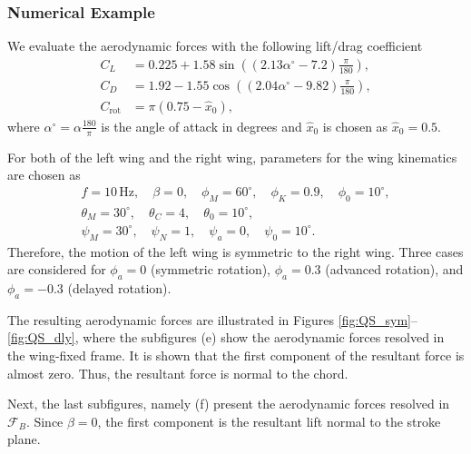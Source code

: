 \documentclass[10pt]{article}
\newcommand{\rot}{\ensuremath{\mathrm{rot}}}
\begin{document}
\subsubsection{Numerical Example}

We evaluate the aerodynamic forces with the following lift/drag coefficient~\cite{sane2002aerodynamic}
\begin{align*}
    C_L & = 0.225 + 1.58 \sin( (2.13\alpha^\circ - 7.2) \frac{\pi}{180}),\\
    C_D & = 1.92 - 1.55 \cos( (2.04 \alpha^\circ - 9.82 ) \frac{\pi}{180}),\\
    C_\rot &  = \pi(0.75 - \hat x_0),
\end{align*}
where $\alpha^\circ = \alpha \frac{180}{\pi}$ is the angle of attack in degrees and $\hat x_0$ is chosen as $\hat x_0=0.5$. 

For both of the left wing and the right wing, parameters for the wing kinematics are chosen as
\begin{gather*}
    f=10\,\mathrm{Hz},\quad \beta=0,\quad \phi_M=60^\circ, \quad \phi_K=0.9, \quad \phi_0 = 10^\circ,\\
    \theta_M = 30^\circ, \quad \theta_C = 4, \quad \theta_0 = 10^\circ,\\
    \psi_M=30^\circ, \quad \psi_N=1, \quad \psi_a=0,\quad \psi_0=10^\circ.
\end{gather*}
Therefore, the motion of the left wing is symmetric to the right wing.
Three cases are considered for $\phi_a=0$ (symmetric rotation), $\phi_a=0.3$ (advanced rotation), and $\phi_a=-0.3$ (delayed rotation).

The resulting aerodynamic forces are illustrated in Figures \ref{fig:QS_sym}--\ref{fig:QS_dly}, where the subfigures (e) show the aerodynamic forces resolved in the wing-fixed frame. 
It is shown that the first component of the resultant force is almost zero. 
Thus, the resultant force is normal to the chord. 

Next, the last subfigures, namely (f) present the aerodynamic forces resolved in $\mathcal{F}_B$. 
Since $\beta=0$, the first component is the resultant lift normal to the stroke plane. 
\end{document}
